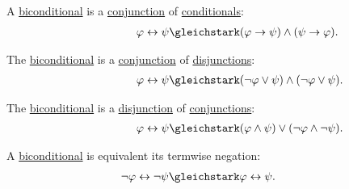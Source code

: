 \begin{proposition}
\begin{thmenum}
     A \hyperref[def:propositional_language/connectives/biconditional]{biconditional} is a \hyperref[def:propositional_language/connectives/conjunction]{conjunction} of \hyperref[def:propositional_language/connectives]{conditionals}:
    \begin{equation}\label{eq:thm:boolean_equivalences/biconditional_via_conditionals}
      \begin{split}
        \mathllap{\varphi \leftrightarrow \psi} &\gleichstark \mathrlap{(\varphi \rightarrow \psi) \wedge (\psi \rightarrow \varphi).}
      \end{split}
    \end{equation}

     The \hyperref[def:propositional_language/connectives/biconditional]{biconditional} is a \hyperref[def:propositional_language/connectives/disjunction]{conjunction} of \hyperref[def:propositional_language/connectives/conjunction]{disjunctions}:
    \begin{equation}\label{eq:thm:boolean_equivalences/biconditional_cnf}
      \begin{split}
        \mathllap{\varphi \leftrightarrow \psi} &\gleichstark \mathrlap{(\neg \varphi \vee \psi) \wedge (\neg \varphi \vee \psi).}
      \end{split}
    \end{equation}

     The \hyperref[def:propositional_language/connectives/biconditional]{biconditional} is a \hyperref[def:propositional_language/connectives/disjunction]{disjunction} of \hyperref[def:propositional_language/connectives/conjunction]{conjunctions}:
    \begin{equation}\label{eq:thm:boolean_equivalences/biconditional_dnf}
      \begin{split}
        \mathllap{\varphi \leftrightarrow \psi} &\gleichstark \mathrlap{(\varphi \wedge \psi) \vee (\neg \varphi \wedge \neg \psi).}
      \end{split}
    \end{equation}

     A \hyperref[def:propositional_language/connectives/biconditional]{biconditional} is equivalent its termwise negation:
    \begin{equation}\label{eq:thm:boolean_equivalences/biconditional_member_negation}
      \begin{split}
        \mathllap{\neg \varphi \leftrightarrow \neg \psi} &\gleichstark \mathrlap{\varphi \leftrightarrow \psi.}
      \end{split}
    \end{equation}


\end{thmenum}
\end{proposition}
